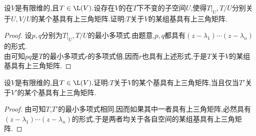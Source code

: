 \documentclass{ctexart}
\begin{document}
\begin{problem}[13.]
    设$V$是有限维的,且$T\in\L(V)$.设存在$V$的在$T$下不变的子空间$U$,使得$T|_U,T/U$分别关于$U,V/U$的某个基具有上三角矩阵.证明:$T$关于$V$的某组基具有上三角矩阵.
\end{problem}
\begin{proof}
    设$p,q$分别为$T|_U,T/U$的最小多项式.由题意,$p,q$都具有$(z-\lambda_1)\cdots(z-\lambda_n)$的形式.\\
    由可知$pq$是$T$的最小多项式$r$的多项式倍,因而$r$也具有上述形式,于是$T$关于$V$的某组基具有上三角矩阵.
\end{proof}
\begin{problem}[14.]
    设$V$是有限维的,且$T\in\L(V)$.证明:$T$关于$V$的某个基具有上三角矩阵,当且仅当$T'$关于$V'$的某个基具有上三角矩阵.
\end{problem}
\begin{proof}
    由可知$T$,$T'$的最小多项式相同,因而如果其中一者具有上三角矩阵,必然具有$(z-\lambda_1)\cdots(z-\lambda_n)$的形式,于是两者均关于各自空间的某组基具有上三角矩阵.
\end{proof}
\end{document}
